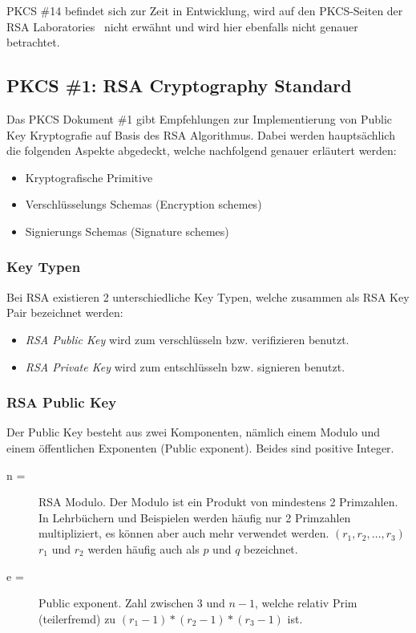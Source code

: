 \documentclass[10pt,a4paper]{article}
\begin{document}
PKCS \#14 befindet sich zur Zeit in Entwicklung, wird auf den PKCS-Seiten der RSA
Laboratories~\cite{pkcs-standards} nicht erwähnt und wird hier ebenfalls nicht genauer
betrachtet.

\subsection{PKCS \#1: RSA Cryptography Standard}

Das PKCS Dokument \#1 gibt Empfehlungen zur Implementierung von Public Key Kryptografie
auf Basis des RSA Algorithmus. Dabei werden hauptsächlich die folgenden Aspekte abgedeckt,
welche nachfolgend genauer erläutert werden:

\begin{itemize}
    \item Kryptografische Primitive
    \item Verschlüsselungs Schemas (Encryption schemes)
    \item Signierungs Schemas (Signature schemes)
\end{itemize}

\subsubsection{Key Typen}

Bei RSA existieren 2 unterschiedliche Key Typen, welche zusammen als RSA Key Pair
bezeichnet werden:

\begin{itemize}
    \item \textit{RSA Public Key} wird zum verschlüsseln bzw. verifizieren benutzt.
    \item \textit{RSA Private Key} wird zum entschlüsseln bzw. signieren benutzt.
\end{itemize}

\subsubsection{RSA Public Key}
\label{sec:rsa-public-key}
Der Public Key besteht aus zwei Komponenten, nämlich einem Modulo und einem öffentlichen
Exponenten (Public exponent). Beides sind positive Integer.

\begin{description}
    \item[n =] RSA Modulo. Der Modulo ist ein Produkt von mindestens 2 Primzahlen. In
        Lehrbüchern und Beispielen werden häufig nur 2 Primzahlen multipliziert, es können
        aber auch mehr verwendet werden. $(r_1, r_2, \dots, r_3)$ $r_1$ und $r_2$ werden
        häufig auch als $p$ und $q$ bezeichnet.
    \item[e =] Public exponent. Zahl zwischen 3 und $n-1$, welche relativ Prim
        (teilerfremd) zu $(r_1 - 1) * (r_2 -1) * (r_3 - 1)$ ist.
\end{description}
\end{document}
